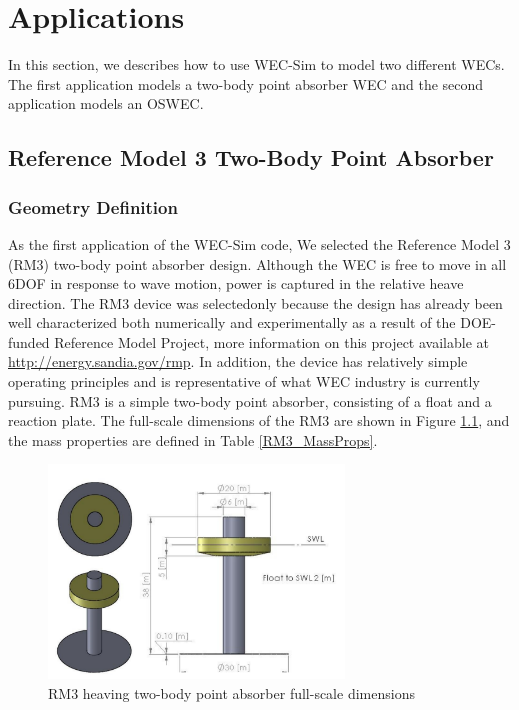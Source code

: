 \chapter{Applications}
In this section, we describes how to use WEC-Sim to model two different WECs.  The first application models a two-body point absorber WEC and the second application models an OSWEC. 
\section{Reference Model 3 Two-Body Point Absorber}
\subsection{Geometry Definition}
As the first application of the WEC-Sim code, We selected the Reference Model 3 (RM3) two-body point absorber design. Although the WEC is free to move in all 6DOF in response to wave motion, power is captured in the relative heave direction. The RM3 device was selectedonly  because the design has already been well characterized both numerically and experimentally as a result of the DOE-funded Reference Model Project, more information on this project available at \href{http://energy.sandia.gov/rmp}{http://energy.sandia.gov/rmp}. In addition, the device has relatively simple operating principles and is representative of what WEC industry is currently pursuing. RM3 is a simple two-body point absorber, consisting of a float and a reaction plate. The full-scale dimensions of the RM3 are shown in Figure \ref{RM3_Geom}, and the mass properties are defined in Table \ref{RM3_MassProps}.  

        \begin{figure}[H]
        \centering
        \includegraphics[width=0.7\textwidth]{application/images/RM3_Geom}
        \caption{RM3 heaving two-body point absorber full-scale dimensions}
        \label{RM3_Geom}
        \end{figure}


